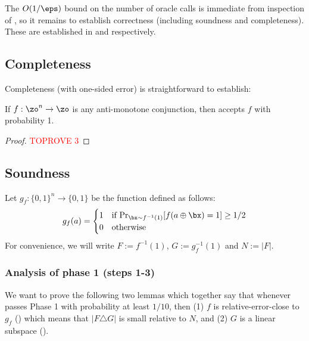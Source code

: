 \documentclass[11pt]{article}
\theoremstyle{definition}
\begin{document}
The $O(1/\eps)$ bound on the number of oracle calls is immediate from inspection of , so it remains to establish correctness (including soundness and completeness).
These are established in  and  respectively.




\subsection{Completeness} 

Completeness (with one-sided error) is straightforward to establish:  
\begin{theorem}\label{thm: f is mono conj}
If $f: \zo^n \to \zo$ is any anti-monotone conjunction, then  accepts $f$ with probability 1.
\end{theorem}

\begin{proof}\textcolor{red}{TOPROVE 3}\end{proof}





\subsection{Soundness} \label{sec:conjunction-soundness}


Let $g_f : \{0,1\}^n \to \{0,1\}$ be the function defined as follows:
\begin{equation} \label{eq:g}
g_f(a)=\begin{cases}
         1 & \text{if $\Pr_{\bx \sim f^{-1}(1)}[f(a \oplus \bx)=1] \geq 1/2$} \\
         0 & \text{otherwise}
    \end{cases}
\end{equation}
For convenience, we will write $F := f^{-1}(1)$, $G := g_f^{-1}(1)$ and $N:=|F |$. 


\subsubsection{Analysis of phase 1 (steps 1-3)}

We want to prove the following two lemmas which together say that whenever  passes Phase 1 with probability at least $1/10$, then  (1) $f$ is  relative-error-close to $g_f$ () which means that $|F \triangle G |$ is small relative to $N$, and (2) $G $ is a linear subspace ().
\end{document}
